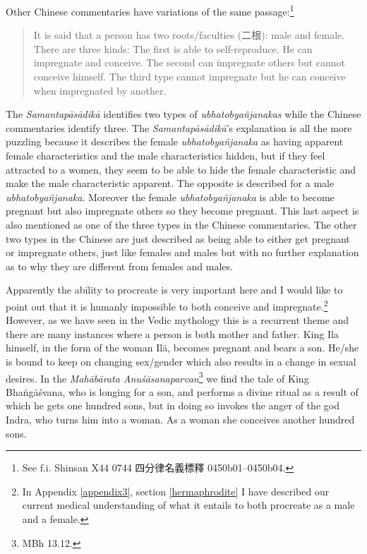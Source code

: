 Other Chinese commentaries have variations of the same passage:\footnote{See f.i. Shinsan X44 0744 四分律名義標釋 0450b01–0450b04.}
\begin{quote}
It is said that a person has two roots/faculties (二根): male and female. There are three kinds: The first is able to self-reproduce. He can impregnate and conceive. The second can impregnate others but cannot conceive himself. The third type cannot impregnate but he can conceive when impregnated by another. 
\end{quote}

The {\em Samantapāsādikā} identifies two types of {\em ubhatob­yañ­janakas} while the Chinese commentaries identify three. The {\em Samantapāsādikā}'s explanation is all the more puzzling because it describes the female {\em ubhatob­yañ­janaka} as having apparent female characteristics and the male characteristics hidden, but if they feel attracted to a women, they seem to be able to hide the female characteristic and make the male characteristic apparent. The opposite is described for a male {\em ubhatob­yañ­janaka}. Moreover the female {\em ubhatob­yañ­janaka} is able to become pregnant but also impregnate others so they become pregnant. This last aspect is also mentioned as one of the three types in the Chinese commentaries. The other two types in the Chinese are just described as being able to either get pregnant or impregnate others, just like females and males but with no further explanation as to why they are different from females and males. 

Apparently the ability to procreate is very important here and I would like to point out that it is humanly impossible to both conceive and impregnate.\footnote{In Appendix \ref{appendix3}, section \ref{hermaphrodite} I have described our current medical understanding of what it entails to both procreate as a male and a female.} However, as we have seen in the Vedic mythology this is a recurrent theme and there are many instances where a person is both mother and father. King Ila himself, in the form of the woman Ilā, becomes pregnant and bears a son. He/she is bound to keep on changing sex/gender which also results in a change in sexual desires. In the {\em Mahābārata Anuśāsanaparvan}\footnote{MBh 13.12.} we find the tale of King Bhaṅgāśvana, who is longing for a son, and performs a divine ritual as a result of which he gets one hundred sons, but in doing so invokes the anger of the god Indra, who turns him into a woman. As a woman she conceives another hundred sons. 

